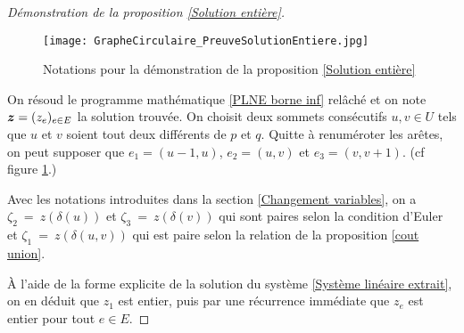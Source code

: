 \begin{proof}[Démonstration de la proposition \ref{Solution entière}]
\begin{figure}[ht]
  \centering
  \texttt{[image: GrapheCirculaire\_PreuveSolutionEntiere.jpg]}
  \caption{Notations pour la démonstration de la proposition \ref{Solution entière}}
  \label{Numerotation aretes parite}
\end{figure}

On résoud le programme mathématique \eqref{PLNE borne inf} relâché et on note $\boldsymbol{z} = (z_e)_{e \in E}$ la solution trouvée. On choisit deux sommets consécutifs $u,v \in U$ tels que $u$ et $v$ soient tout deux différents de $p$ et $q$. Quitte à renuméroter les arêtes, on peut supposer que $e_1 = (u-1,u)$, $e_2 = (u,v)$ et $e_3 = (v,v+1)$. (cf figure \ref{Numerotation aretes parite}.)

Avec les notations introduites dans la section \ref{Changement variables}, on a $\zeta_2~=~z(\delta(u))$ et $\zeta_3~=~z(\delta(v))$ qui sont paires selon la condition d'Euler et $\zeta_1~=~z(\delta({u,v}))$ qui est paire selon la relation de la proposition \ref{cout union}.

\`A l'aide de la forme explicite de la solution du système \eqref{Système linéaire extrait}, on en déduit que $z_1$ est entier, puis par une récurrence immédiate que $z_e$ est entier pour tout $e \in E$.
\end{proof}

